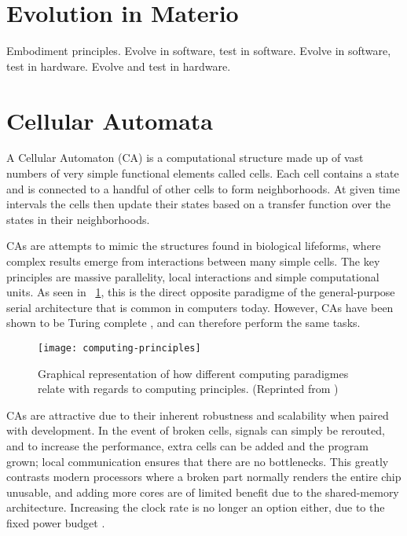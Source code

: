 
\section{Evolution in Materio}

\TODO
Embodiment principles.
Evolve in software, test in software.
Evolve in software, test in hardware.
Evolve and test in hardware.


\section{Cellular Automata}

A Cellular Automaton (CA) is a computational structure made up of vast numbers of very simple functional elements called cells.
Each cell contains a state and is connected to a handful of other cells to form neighborhoods.
At given time intervals the cells then update their states based on a transfer function over the states in their neighborhoods.\footnotemark


CAs are attempts to mimic the structures found in biological lifeforms, where complex results emerge from interactions between many simple cells.
The key principles are massive parallelity, local interactions and simple computational units.
As seen in \figurename~\ref{fig:computing-principles}, this is the direct opposite paradigme of the general-purpose serial architecture that is common in computers today.
However, CAs have been shown to be Turing complete \cite{codd1968cellular, neumann1966selfreplication}, and can therefore perform the same tasks.

\begin{figure}[!ht]
    \centering
    \texttt{[image: computing-principles]}
    \caption[Computing principles]{
        Graphical representation of how different computing paradigmes relate with regards to computing principles.
        (Reprinted from \cite{sipper1999emergence})
    }
    \label{fig:computing-principles}
\end{figure}

CAs are attractive due to their inherent robustness and scalability when paired with development.
In the event of broken cells, signals can simply be rerouted, and to increase the performance, extra cells can be added and the program grown; local communication ensures that there are no bottlenecks.
This greatly contrasts modern processors where a broken part normally renders the entire chip unusable, and adding more cores are of limited benefit due to the shared-memory architecture.
Increasing the clock rate is no longer an option either, due to the fixed power budget .

